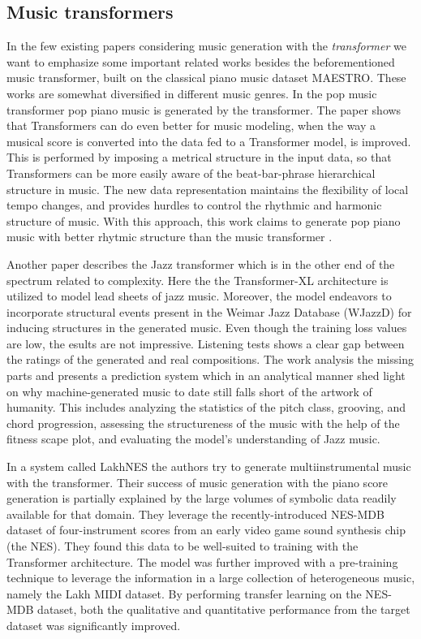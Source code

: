 \documentclass{IEEEtran}
\begin{document}
       \subsection{Music transformers}
       In the few existing papers considering music generation with the \emph{transformer} we want to emphasize some important related works besides the beforementioned music transformer, built on the classical piano music dataset MAESTRO. These works are somewhat diversified in different music genres. In the pop music transformer \cite{huang2020pop} pop piano music is generated by the transformer. The paper shows that Transformers can do even better for music modeling, when the way a musical score is converted into the data fed to a Transformer model, is improved. This is performed by imposing a metrical structure in the input data, so that Transformers can be more easily aware of the beat-bar-phrase hierarchical structure in music. The new data representation maintains the flexibility of local tempo changes, and provides hurdles to control the rhythmic and harmonic structure of music. With this approach, this work claims to generate pop piano music with better rhytmic structure than the music transformer \cite{huang2018music}.


       Another paper describes the Jazz transformer \cite{wu2020jazz} which is in the other end of the spectrum related to complexity. Here the the Transformer-XL architecture is utilized to model lead sheets of jazz music. Moreover, the model endeavors to incorporate structural events present in the Weimar Jazz Database (WJazzD) for inducing structures in the generated music. Even though the training loss values are low, the esults are not impressive. Listening tests shows a clear gap between the ratings of the generated and real compositions. The work analysis the missing parts and presents a prediction system which in an analytical manner shed light on why machine-generated music to date still falls short of the artwork of humanity. This includes analyzing the statistics of
       the pitch class, grooving, and chord progression, assessing the structureness of the music with the help of the fitness scape plot, and evaluating the model’s understanding of Jazz music.

       In a system called LakhNES \cite{lakhnes ref} the authors try to generate multiinstrumental music with the transformer. Their success of music generation with the piano score generation is partially explained by the large volumes of symbolic data readily available for that domain. They leverage the recently-introduced NES-MDB dataset of four-instrument scores from an early video game sound synthesis chip (the NES). They found this data to be well-suited to training with the Transformer architecture. The model was further improved with a pre-training technique to leverage the information in a large collection of heterogeneous music, namely the Lakh MIDI dataset. By performing transfer learning on the NES-MDB dataset, both the qualitative and quantitative performance from the target dataset was significantly improved.
       
\end{document}
